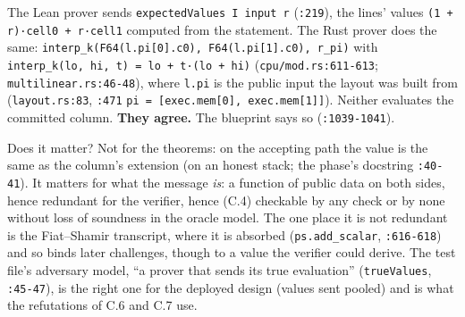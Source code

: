 The Lean prover sends \texttt{expectedValues I input r} (\texttt{:219}), the lines' values \texttt{(\allowbreak{}1 + r)·cell0 + r·cell1} computed from the statement. The Rust prover does the same: \texttt{i\allowbreak{}n\allowbreak{}t\allowbreak{}e\allowbreak{}r\allowbreak{}p\allowbreak{}\_\allowbreak{}k\allowbreak{}(\allowbreak{}F\allowbreak{}6\allowbreak{}4\allowbreak{}(\allowbreak{}l\allowbreak{}.\allowbreak{}p\allowbreak{}i\allowbreak{}[\allowbreak{}0\allowbreak{}]\allowbreak{}.\allowbreak{}c\allowbreak{}0\allowbreak{})\allowbreak{},\allowbreak{} F\allowbreak{}6\allowbreak{}4\allowbreak{}(\allowbreak{}l\allowbreak{}.\allowbreak{}p\allowbreak{}i\allowbreak{}[\allowbreak{}1\allowbreak{}]\allowbreak{}.\allowbreak{}c\allowbreak{}0\allowbreak{})\allowbreak{},\allowbreak{} r\allowbreak{}\_\allowbreak{}p\allowbreak{}i\allowbreak{})} with \texttt{i\allowbreak{}n\allowbreak{}t\allowbreak{}e\allowbreak{}r\allowbreak{}p\allowbreak{}\_\allowbreak{}k\allowbreak{}(\allowbreak{}l\allowbreak{}o\allowbreak{},\allowbreak{} h\allowbreak{}i\allowbreak{},\allowbreak{} t\allowbreak{})\allowbreak{} =\allowbreak{} l\allowbreak{}o\allowbreak{} +\allowbreak{} t\allowbreak{}·\allowbreak{}(\allowbreak{}l\allowbreak{}o\allowbreak{} +\allowbreak{} h\allowbreak{}i\allowbreak{})} (\texttt{cpu/\allowbreak{}mod.\allowbreak{}rs:611-{}613}; \texttt{multilinear.\allowbreak{}rs:46-{}48}), where \texttt{l.\allowbreak{}pi} is the public input the layout was built from (\texttt{layout.\allowbreak{}rs:83}, \texttt{:471} \texttt{p\allowbreak{}i\allowbreak{} =\allowbreak{} [\allowbreak{}e\allowbreak{}x\allowbreak{}e\allowbreak{}c\allowbreak{}.\allowbreak{}m\allowbreak{}e\allowbreak{}m\allowbreak{}[\allowbreak{}0\allowbreak{}]\allowbreak{},\allowbreak{} e\allowbreak{}x\allowbreak{}e\allowbreak{}c\allowbreak{}.\allowbreak{}m\allowbreak{}e\allowbreak{}m\allowbreak{}[\allowbreak{}1\allowbreak{}]\allowbreak{}]}). Neither evaluates the committed column. \textbf{They agree.} The blueprint says so (\texttt{:1039-{}1041}).

Does it matter? Not for the theorems: on the accepting path the value is the same as the column's extension (on an honest stack; the phase's docstring \texttt{:40-{}41}). It matters for what the message \emph{is}: a function of public data on both sides, hence redundant for the verifier, hence (C.4) checkable by any check or by none without loss of soundness in the oracle model. The one place it is not redundant is the Fiat–Shamir transcript, where it is absorbed (\texttt{ps.\allowbreak{}add\_\allowbreak{}scalar}, \texttt{:616-{}618}) and so binds later challenges, though to a value the verifier could derive. The test file's adversary model, \enquote{a prover that sends its true evaluation} (\texttt{trueValues}, \texttt{:45-{}47}), is the right one for the deployed design (values sent pooled) and is what the refutations of C.6 and C.7 use.

